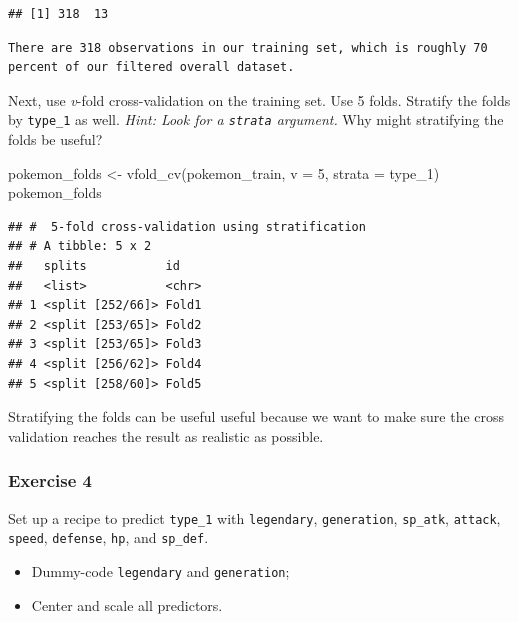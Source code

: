 \documentclass[
]{article}
\newenvironment{Shaded}{\begin{snugshade}}{\end{snugshade}}
\newcommand{\AttributeTok}[1]{\textcolor[rgb]{0.77,0.63,0.00}{#1}}
\newcommand{\DecValTok}[1]{\textcolor[rgb]{0.00,0.00,0.81}{#1}}
\newcommand{\FunctionTok}[1]{\textcolor[rgb]{0.00,0.00,0.00}{#1}}
\newcommand{\NormalTok}[1]{#1}
\newcommand{\OtherTok}[1]{\textcolor[rgb]{0.56,0.35,0.01}{#1}}
\newcommand{\StringTok}[1]{\textcolor[rgb]{0.31,0.60,0.02}{#1}}
\begin{document}
\begin{verbatim}
## [1] 318  13
\end{verbatim}

\begin{verbatim}
There are 318 observations in our training set, which is roughly 70 percent of our filtered overall dataset.
\end{verbatim}

Next, use \emph{v}-fold cross-validation on the training set. Use 5
folds. Stratify the folds by \texttt{type\_1} as well. \emph{Hint: Look
for a \texttt{strata} argument.} Why might stratifying the folds be
useful?

\begin{Shaded}
\begin{Highlighting}[]
\NormalTok{pokemon\_folds }\OtherTok{\textless{}{-}} \FunctionTok{vfold\_cv}\NormalTok{(pokemon\_train, }\AttributeTok{v =} \DecValTok{5}\NormalTok{, }\AttributeTok{strata =} \StringTok{\textquotesingle{}type\_1\textquotesingle{}}\NormalTok{)}
\NormalTok{pokemon\_folds}
\end{Highlighting}
\end{Shaded}

\begin{verbatim}
## #  5-fold cross-validation using stratification 
## # A tibble: 5 x 2
##   splits           id   
##   <list>           <chr>
## 1 <split [252/66]> Fold1
## 2 <split [253/65]> Fold2
## 3 <split [253/65]> Fold3
## 4 <split [256/62]> Fold4
## 5 <split [258/60]> Fold5
\end{verbatim}

Stratifying the folds can be useful useful because we want to make sure
the cross validation reaches the result as realistic as possible.

\hypertarget{exercise-4}{%
\subsubsection{Exercise 4}\label{exercise-4}}

Set up a recipe to predict \texttt{type\_1} with \texttt{legendary},
\texttt{generation}, \texttt{sp\_atk}, \texttt{attack}, \texttt{speed},
\texttt{defense}, \texttt{hp}, and \texttt{sp\_def}.

\begin{itemize}
\item
  Dummy-code \texttt{legendary} and \texttt{generation};
\item
  Center and scale all predictors.
\end{itemize}
\end{document}

